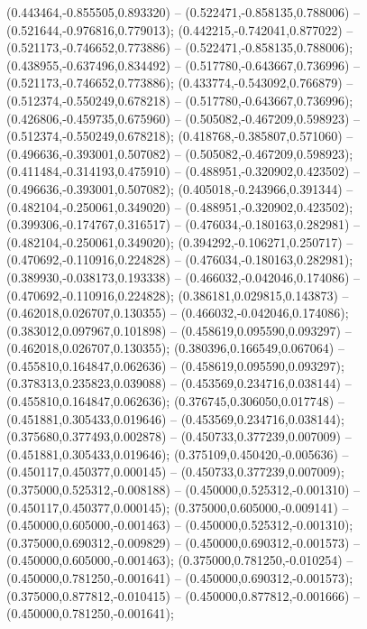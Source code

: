  (0.443464,-0.855505,0.893320) -- (0.522471,-0.858135,0.788006) -- (0.521644,-0.976816,0.779013);
 (0.442215,-0.742041,0.877022) -- (0.521173,-0.746652,0.773886) -- (0.522471,-0.858135,0.788006);
 (0.438955,-0.637496,0.834492) -- (0.517780,-0.643667,0.736996) -- (0.521173,-0.746652,0.773886);
 (0.433774,-0.543092,0.766879) -- (0.512374,-0.550249,0.678218) -- (0.517780,-0.643667,0.736996);
 (0.426806,-0.459735,0.675960) -- (0.505082,-0.467209,0.598923) -- (0.512374,-0.550249,0.678218);
 (0.418768,-0.385807,0.571060) -- (0.496636,-0.393001,0.507082) -- (0.505082,-0.467209,0.598923);
 (0.411484,-0.314193,0.475910) -- (0.488951,-0.320902,0.423502) -- (0.496636,-0.393001,0.507082);
 (0.405018,-0.243966,0.391344) -- (0.482104,-0.250061,0.349020) -- (0.488951,-0.320902,0.423502);
 (0.399306,-0.174767,0.316517) -- (0.476034,-0.180163,0.282981) -- (0.482104,-0.250061,0.349020);
 (0.394292,-0.106271,0.250717) -- (0.470692,-0.110916,0.224828) -- (0.476034,-0.180163,0.282981);
 (0.389930,-0.038173,0.193338) -- (0.466032,-0.042046,0.174086) -- (0.470692,-0.110916,0.224828);
 (0.386181,0.029815,0.143873) -- (0.462018,0.026707,0.130355) -- (0.466032,-0.042046,0.174086);
 (0.383012,0.097967,0.101898) -- (0.458619,0.095590,0.093297) -- (0.462018,0.026707,0.130355);
 (0.380396,0.166549,0.067064) -- (0.455810,0.164847,0.062636) -- (0.458619,0.095590,0.093297);
 (0.378313,0.235823,0.039088) -- (0.453569,0.234716,0.038144) -- (0.455810,0.164847,0.062636);
 (0.376745,0.306050,0.017748) -- (0.451881,0.305433,0.019646) -- (0.453569,0.234716,0.038144);
 (0.375680,0.377493,0.002878) -- (0.450733,0.377239,0.007009) -- (0.451881,0.305433,0.019646);
 (0.375109,0.450420,-0.005636) -- (0.450117,0.450377,0.000145) -- (0.450733,0.377239,0.007009);
 (0.375000,0.525312,-0.008188) -- (0.450000,0.525312,-0.001310) -- (0.450117,0.450377,0.000145);
 (0.375000,0.605000,-0.009141) -- (0.450000,0.605000,-0.001463) -- (0.450000,0.525312,-0.001310);
 (0.375000,0.690312,-0.009829) -- (0.450000,0.690312,-0.001573) -- (0.450000,0.605000,-0.001463);
 (0.375000,0.781250,-0.010254) -- (0.450000,0.781250,-0.001641) -- (0.450000,0.690312,-0.001573);
 (0.375000,0.877812,-0.010415) -- (0.450000,0.877812,-0.001666) -- (0.450000,0.781250,-0.001641);
